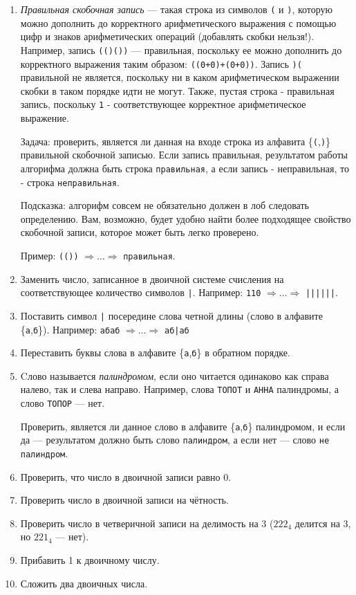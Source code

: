 \documentclass[12pt,a4paper,oneside]{article}
\newcommand{\s}[1]{\texttt{#1}}
\begin{document}
\begin{enumerate}
\item \emph{Правильная скобочная запись} --- такая строка из 
символов \s{(} и \s{)}, которую можно дополнить до корректного 
арифметического выражения с помощью цифр и знаков арифметических операций 
(добавлять скобки нельзя!). 
Например, запись \s{(()())} --- правильная, поскольку 
ее можно дополнить до корректного выражения таким образом: 
\s{((0+0)+(0+0))}. Запись \s{)(} правильной не является, поскольку 
ни в каком арифметическом выражении скобки в таком порядке идти не могут. 
Также, пустая строка - правильная запись, поскольку \s{1} - соответствующее 
корректное арифметическое выражение. 

Задача: проверить, является ли данная на входе строка из алфавита \{\s{(},\s{)}\}
правильной скобочной записью. Если запись правильная, результатом работы 
алгорифма должна быть строка \s{правильная}, а если запись - неправильная, 
то - строка \s{неправильная}.

Подсказка: алгорифм совсем не обязательно должен в лоб следовать 
определению. Вам, возможно, будет удобно найти более подходящее свойство скобочной 
записи, которое может быть легко проверено.

Пример: \s{(())} $\Rightarrow\dots\Rightarrow$ \s{правильная}.

\item Заменить число, записанное в двоичной системе счисления на 
соответствующее количество символов \s{|}. Например: 
\s{110} $\Rightarrow\dots\Rightarrow$ \s{||||||}.

\item Поставить символ \s{|} посередине слова четной длины (слово в алфавите
\{\s{а},\s{б}\}). 
Например: \s{абаб} $\Rightarrow\dots\Rightarrow$ \s{аб|аб}

\item Переставить буквы слова в алфавите \{\s{а},\s{б}\} в обратном порядке.

\item Cлово называется \emph{палиндромом}, если оно читается одинаково
как справа налево, так и слева направо. Например, слова \s{ТОПОТ} и 
\s{АННА} палиндромы, а слово \s{ТОПОР} --- нет. 

Проверить, является ли данное слово в алфавите \{\s{а},\s{б}\} 
палиндромом, и если да --- результатом должно быть слово \s{палиндром}, 
а если нет --- слово \s{не палиндром}.

\item Проверить, что число в двоичной записи равно 0.
\item Проверить число в двоичной записи на чётность.
\item Проверить число в четверичной записи на делимость на 3 ($222_4$ делится на 3, но $221_4$ --- нет).

\item Прибавить 1 к двоичному числу.

\item Сложить два двоичных числа.
\end{enumerate}
\end{document}
